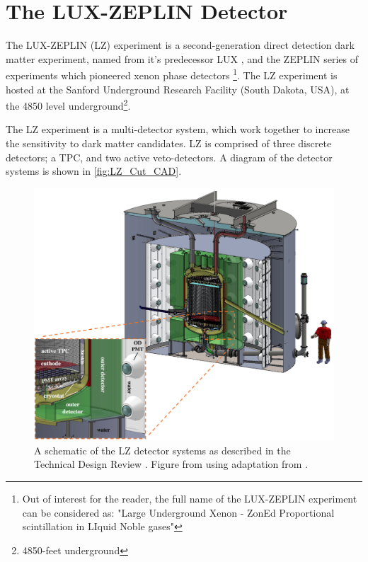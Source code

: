 \section{The LUX-ZEPLIN Detector}
\label{sec:lz_detector}
\par
The LUX-ZEPLIN (LZ) experiment is a second-generation direct detection dark matter experiment, named from it's predecessor LUX \cite{lux_ref}, and the ZEPLIN series of experiments which pioneered xenon phase detectors \cite{zeplin_3_ref}\footnote{Out of interest for the reader, the full name of the LUX-ZEPLIN experiment can be considered as: "Large Underground Xenon - ZonEd Proportional scintillation in LIquid Noble gases"}.
The LZ experiment is hosted at the Sanford Underground Research Facility (South Dakota, USA), at the 4850 level underground\footnote{4850-feet underground}.

\par
The LZ experiment is a multi-detector system, which work together to increase the sensitivity to dark matter candidates.
LZ is comprised of three discrete detectors; a TPC, and two active veto-detectors.
A diagram of the detector systems is shown in \autoref{fig:LZ_Cut_CAD}.

\begin{figure}
    \centering
    \includegraphics[width=\textwidth]{Figures/LZ/LZ_CAD_with_interactions.png}
    \caption{A schematic of the LZ detector systems as described in the Technical Design Review \cite{LZ_TechnicalDesignReview_ref}.
             Figure from \cite{LZ_TechnicalDesignReview_ref} using adaptation from \cite{LZ_Ibles_LZStats_Thesis_ref}.}
    \label{fig:LZ_Cut_CAD}
\end{figure}

